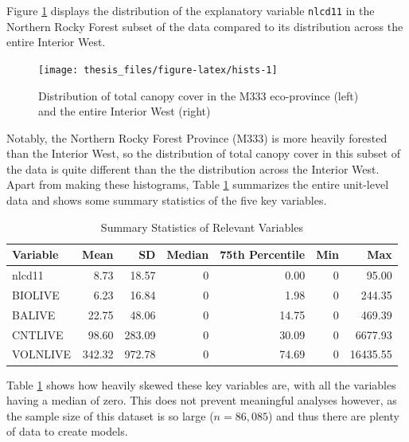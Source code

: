 \documentclass[12pt,twoside]{reedthesis}
\begin{document}
Figure \ref{fig:hists} displays the distribution of the explanatory variable \texttt{nlcd11} in the Northern Rocky Forest subset of the data compared to its distribution across the entire Interior West.
\begin{figure}

{\centering \texttt{[image: thesis\_files/figure-latex/hists-1]} 

}

\caption[Total canopy cover in the M333 eco-province and Interior West]{Distribution of total canopy cover in the M333 eco-province (left) and the entire Interior West (right)}\label{fig:hists}
\end{figure}
Notably, the Northern Rocky Forest Province (M333) is more heavily forested than the Interior West, so the distribution of total canopy cover in this subset of the data is quite different than the the distribution across the Interior West. Apart from making these histograms, Table \ref{tab:var-tab} summarizes the entire unit-level data and shows some summary statistics of the five key variables.
\clearpage
\begin{longtable}[t]{lrrrrrr}
\caption[Summary Statistics of Relevant Variables]{\label{tab:var-tab}Summary Statistics of Relevant Variables}\\
\toprule
Variable & Mean & SD & Median & 75th Percentile & Min & Max\\
\midrule
nlcd11 & 8.73 & 18.57 & 0 & 0.00 & 0 & 95.00\\
BIOLIVE & 6.23 & 16.84 & 0 & 1.98 & 0 & 244.35\\
BALIVE & 22.75 & 48.06 & 0 & 14.75 & 0 & 469.39\\
CNTLIVE & 98.60 & 283.09 & 0 & 30.09 & 0 & 6677.93\\
VOLNLIVE & 342.32 & 972.78 & 0 & 74.69 & 0 & 16435.55\\
\bottomrule
\end{longtable}
Table \ref{tab:var-tab} shows how heavily skewed these key variables are, with all the variables having a median of zero. This does not prevent meaningful analyses however, as the sample size of this dataset is so large (\(n = 86,085\)) and thus there are plenty of data to create models.
\end{document}
